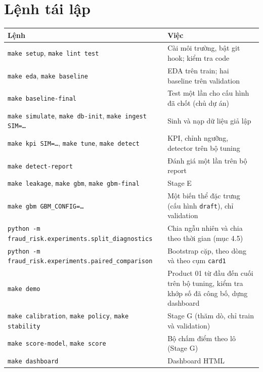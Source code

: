 \documentclass[11pt,a4paper]{article}
\newcommand{\code}[1]{\texttt{\small #1}}
\begin{document}
\appendix
\section{Lệnh tái lập}
\begin{tabularx}{\linewidth}{@{}lX@{}}
\toprule
Lệnh & Việc \\ \midrule
\code{make setup}, \code{make lint test} & Cài môi trường, bật git hook; kiểm tra code \\
\code{make eda}, \code{make baseline} & EDA trên train; hai baseline trên validation \\
\code{make baseline-final} & Test một lần cho cấu hình đã chốt (chủ dự án) \\
\code{make simulate}, \code{make db-init}, \code{make ingest SIM=…} & Sinh và nạp dữ liệu giả lập \\
\code{make kpi SIM=…}, \code{make tune}, \code{make detect} & KPI, chỉnh ngưỡng, detector trên bộ tuning \\
\code{make detect-report} & Đánh giá một lần trên bộ report \\
\code{make leakage}, \code{make gbm}, \code{make gbm-final} & Stage E \\
\code{make gbm GBM\_CONFIG=…} & Một biến thể đặc trưng (cấu hình \code{draft}), chỉ validation \\
\code{python -m fraud\_risk.experiments.split\_diagnostics} & Chia ngẫu nhiên và chia theo thời gian (mục 4.5) \\
\code{python -m fraud\_risk.experiments.paired\_comparison} & Bootstrap cặp, theo dòng và theo cụm \code{card1} \\
\code{make demo} & Product 01 từ đầu đến cuối trên bộ tuning, kiểm tra khớp số đã công bố, dựng dashboard \\
\code{make calibration}, \code{make policy}, \code{make stability} & Stage G (thăm dò, chỉ train và validation) \\
\code{make score-model}, \code{make score} & Bộ chấm điểm theo lô (Stage G) \\
\code{make dashboard} & Dashboard HTML \\ \bottomrule
\end{tabularx}
\end{document}
